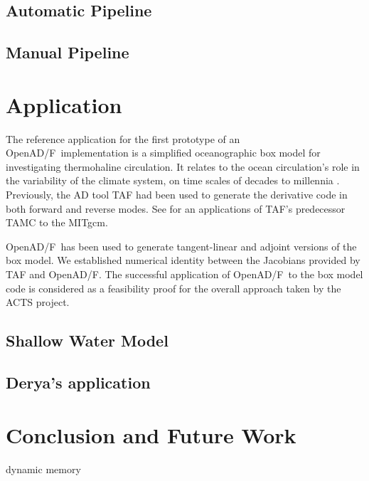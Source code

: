 \documentclass[11pt]{article}
\newcommand{\OpenADF}{OpenAD/F}
\begin{document}
\subsection{Automatic Pipeline}
\subsection{Manual Pipeline}\label{ssec:manualPipeline}


\section{Application}\label{sec:application}

The reference application for the first prototype of an \OpenADF\ implementation
is a simplified oceanographic box model for investigating
thermohaline circulation. It relates to the
ocean circulation's role in the variability of the climate system,
on time scales of decades to millennia \cite{tzi-ioa:02}.
Previously, the AD tool TAF \cite{GiKa02} 
had been used to generate the derivative
code in both forward and reverse modes.
See \cite{maro-eta:99} for an applications of
TAF's predecessor TAMC to the MITgcm.

\OpenADF\ has been used to generate tangent-linear and 
adjoint versions of the box model. We established numerical identity between
the Jacobians provided by TAF and \OpenADF.
The successful 
application of \OpenADF\ to the box model code is considered as a feasibility 
proof for the overall approach taken by the ACTS project.  
\subsection{Shallow Water Model}
\subsection{Derya's application}
\section{Conclusion and Future Work}\label{sec:concl}

{\color{red} dynamic memory}
\end{document}
